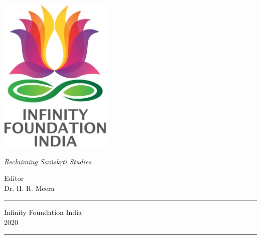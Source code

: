 \thispagestyle{empty}
\begin{center}
\includegraphics[scale=0.3]{images/logo.png}
\bigskip

{\fontsize{10}{14}\selectfont\sl
Reclaiming Saṁskṛti Studies
}

\bigskip
\end{center}
\medskip

\begin{center}
{\fontsize{20}{24}\selectfont {Karnāṭaka Śāstrīya Saṅgīta}}

\small

{\fontsize{16}{17}\selectfont {Past, Present, and Future}}

\vfill


\bigskip
 
{\fontsize{14}{18}\selectfont 
Editor\\[3pt]
Dr. H. R. Meera}\par
\vfill

\rule{5cm}{1pt}

{\fontsize{12}{14}\selectfont
Infinity Foundation India\\[4pt]
2020}

\rule{5cm}{1pt}
\end{center}




